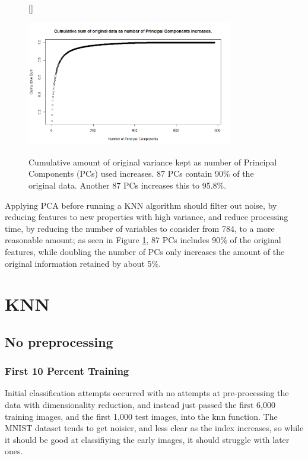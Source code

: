 \documentclass[11pt]{article} %
\begin{document}
\begin{figure}[htb!]
[\FBwidth]
{\caption{Cumulative amount of original variance kept as number of Principal Components (PCs) used increases. 87 PCs contain 90\% of the original data. Another 87 PCs increases this to 95.8\%.}\label{fig:cumsum_pca}}
{\includegraphics[width=0.8\textwidth]{cumulative_pca.png}}
\end{figure}

Applying PCA before running a KNN algorithm should filter out noise, by reducing features to new properties with high variance, and reduce processing time, by reducing the number of variables to consider from 784, to a more reasonable amount; as seen in Figure \ref{fig:cumsum_pca}, 87 PCs includes 90\% of the original features, while doubling the number of PCs only increases the amount of the original information retained by about 5\%.




\section{KNN}

\subsection{No preprocessing}

\subsubsection{First 10 Percent Training}

Initial classification attempts occurred with no attempts at pre-processing the data with dimensionality reduction, and instead just passed the first 6,000 training images, and the first 1,000 test images, into the knn function. The MNIST dataset tends to get noisier, and less clear as the index increases, so while it should be good at classifiying the early images, it should struggle with later ones. 
\end{document}
